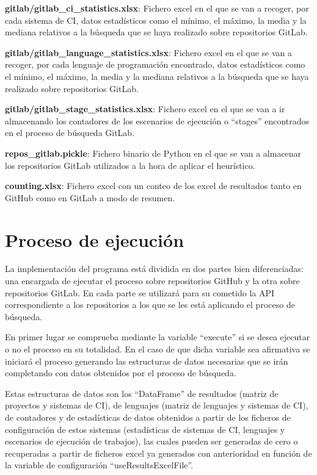 \begin{compactitem}
    \item \textbf{gitlab/gitlab\_ci\_statistics.xlsx}: Fichero excel en el que se van a recoger, por cada sistema de CI, datos estadísticos como el mínimo, el máximo, la media y la mediana relativos a la búsqueda que se haya realizado sobre repositorios GitLab.
    \item \textbf{gitlab/gitlab\_language\_statistics.xlsx}: Fichero excel en el que se van a recoger, por cada lenguaje de programación encontrado, datos estadísticos como el mínimo, el máximo, la media y la mediana relativos a la búsqueda que se haya realizado sobre repositorios GitLab.
    \item \textbf{gitlab/gitlab\_stage\_statistics.xlsx}: Fichero excel en el que se van a ir almacenando los contadores de los escenarios de ejecución o ``stages'' encontrados en el proceso de búsqueda GitLab.
    \item \textbf{repos\_gitlab.pickle}: Fichero binario de Python en el que se van a almacenar los repositorios GitLab utilizados a la hora de aplicar el heurístico.
    \item \textbf{counting.xlsx}: Fichero excel con un conteo de los excel de resultados tanto en GitHub como en GitLab a modo de resumen.
\end{compactitem}

\section{Proceso de ejecución}
La implementación del programa está dividida en dos partes bien diferenciadas: una encargada de ejecutar el proceso  sobre repositorios GitHub y la otra sobre repositorios GitLab. En cada parte se utilizará para su cometido la API correspondiente a los repositorios a los que se les está aplicando el proceso de búsqueda.

En primer lugar se comprueba mediante la variable ``execute'' si se desea ejecutar o no el proceso en su totalidad. En el caso de que dicha variable sea afirmativa se iniciará el proceso generando las estructuras de datos necesarias que se irán completando con datos obtenidos por el proceso de búsqueda. 

Estas estructuras de datos son los ``DataFrame'' de resultados (matriz de proyectos y sistemas de CI), de lenguajes (matriz de lenguajes y sistemas de CI), de contadores y de estadísticas de datos obtenidos a partir de los ficheros de configuración de estos sistemas (estadísticas de sistemas de CI, lenguajes y escenarios de ejecución de trabajos), las cuales pueden ser generadas de cero o recuperadas a partir de ficheros excel ya generados con anterioridad en función de la variable de configuración ``useResultsExcelFile''.

